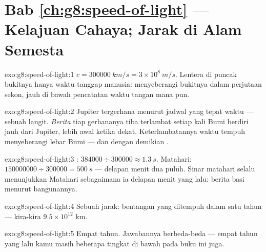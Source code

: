 \section*{Bab \ref{ch:g8:speed-of-light} --- Kelajuan Cahaya; Jarak di Alam Semesta}

\begin{solution}{exo:g8:speed-of-light:1}
$c = \qty{300000}{km/s} = 3 \times 10^{8}\ \unit{m/s}$. Lentera di
puncak bukitnya hanya  waktu tanggap manusia: 
menyeberangi bukitnya dalam perjutaan sekon, jauh di bawah pencatatan
waktu tangan mana pun.
\end{solution}

\begin{solution}{exo:g8:speed-of-light:2}
 Jupiter tergerhana menurut jadwal yang tepat waktu --- sebuah
 langit. \emph{Berita} tiap gerhananya tiba terlambat setiap kali
Bumi berdiri jauh dari Jupiter, lebih awal ketika dekat.
Keterlambatannya  waktu tempuh  menyeberangi lebar 
Bumi --- dan dengan demikian   .
\end{solution}

\begin{solution}{exo:g8:speed-of-light:3}
: $384000 \div 300000 \approx \qty{1.3}{s}$. Matahari:
$150000000 \div 300000 = \qty{500}{s}$ --- delapan menit dua puluh.
Sinar matahari selalu menunjukkan Matahari sebagaimana ia delapan
menit yang lalu: berita basi menurut bangunannya.
\end{solution}

\begin{solution}{exo:g8:speed-of-light:4}
Sebuah jarak: bentangan yang ditempuh  dalam satu tahun ---
kira-kira $9.5 \times 10^{12}$ km.
\end{solution}

\begin{solution}{exo:g8:speed-of-light:5}
Empat tahun. Jawabannya berbeda-beda --- empat tahun yang lalu kamu
masih beberapa tingkat di bawah pada buku ini juga.
\end{solution}


